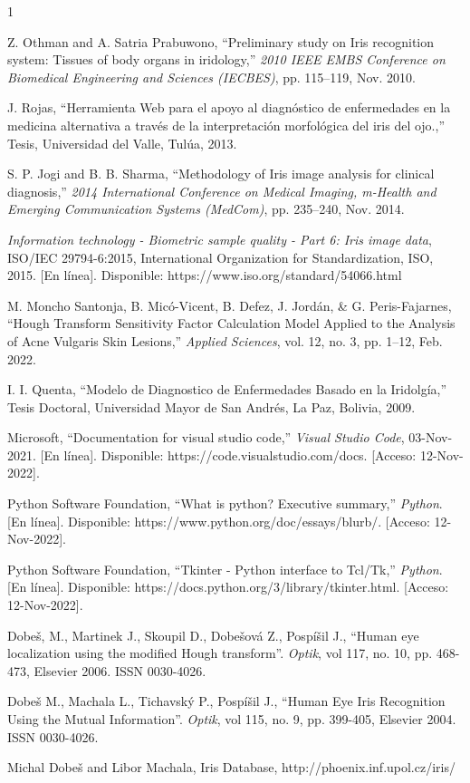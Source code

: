\documentclass[12pt]{article}
\begin{document}
\begin{thebibliography}{1}


Z. Othman and A. Satria Prabuwono, “Preliminary study on Iris recognition system: Tissues of body organs in iridology,” \emph{2010 IEEE EMBS Conference on Biomedical Engineering and Sciences (IECBES)}, pp. 115–119, Nov. 2010.

J. Rojas, “Herramienta Web para el apoyo al diagnóstico de enfermedades en la medicina alternativa a través de la interpretación morfológica del iris del ojo.,” Tesis, Universidad del Valle, Tulúa, 2013.

S. P. Jogi and B. B. Sharma, “Methodology of Iris image analysis for clinical diagnosis,” \emph{2014 International Conference on Medical Imaging, m-Health and Emerging Communication Systems (MedCom)}, pp. 235–240, Nov. 2014. 

\emph{Information technology - Biometric sample quality - Part 6: Iris image data}, ISO/IEC 29794-6:2015, International Organization for Standardization, ISO, 2015. [En línea]. Disponible: https://www.iso.org/standard/54066.html

M. Moncho Santonja, B. Micó-Vicent, B. Defez, J. Jordán, \& G. Peris-Fajarnes, “Hough Transform Sensitivity Factor Calculation Model Applied to the Analysis of Acne Vulgaris Skin Lesions,” \emph{Applied Sciences}, vol. 12, no. 3, pp. 1–12, Feb. 2022. 

I. I. Quenta, “Modelo de Diagnostico de Enfermedades Basado en la Iridolgía,” Tesis Doctoral, Universidad Mayor de San Andrés, La Paz, Bolivia, 2009. 

Microsoft, “Documentation for visual studio code,” \emph{Visual Studio Code}, 03-Nov-2021. [En línea]. Disponible: https://code.visualstudio.com/docs. [Acceso: 12-Nov-2022]. 

Python Software Foundation, “What is python? Executive summary,” \emph{Python}. [En línea]. Disponible: https://www.python.org/doc/essays/blurb/. [Acceso: 12-Nov-2022]. 

Python Software Foundation, “Tkinter - Python interface to Tcl/Tk,” \emph{Python}. [En línea]. Disponible: https://docs.python.org/3/library/tkinter.html. [Acceso: 12-Nov-2022]. 

Dobeš, M., Martinek J., Skoupil D., Dobešová Z.,  Pospíšil J., “Human eye localization using the modified Hough transform”. \emph{Optik}, vol 117, no. 10, pp. 468-473, Elsevier 2006. ISSN 0030-4026.

Dobeš M., Machala L., Tichavský P., Pospíšil J., “Human Eye Iris Recognition Using the Mutual Information”. \emph{Optik}, vol 115, no. 9, pp. 399-405, Elsevier 2004. ISSN 0030-4026.

Michal Dobeš and Libor Machala, Iris Database, http://phoenix.inf.upol.cz/iris/

\end{thebibliography}
\end{document}
